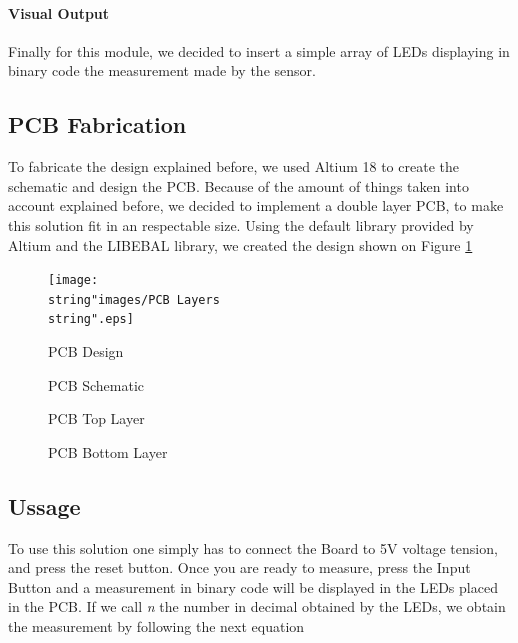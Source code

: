 \paragraph{Visual Output}

Finally for this module, we decided to insert a simple array of LEDs
displaying in binary code the measurement made by the sensor.

\subsection{PCB Fabrication}

To fabricate the design explained before, we used Altium 18 to create
the schematic and design the PCB. Because of the amount of things
taken into account explained before, we decided to implement a double
layer PCB, to make this solution fit in an respectable size. Using
the default library provided by Altium and the LIBEBAL library, we
created the design shown on Figure \ref{8_9}

\begin{figure}[H]
\begin{centering}
\texttt{[image: \\string"images/PCB Layers\\string".eps]}
\par\end{centering}
\caption{PCB Design}
\label{8_9}
\end{figure}

\begin{figure}[H]

\caption{PCB Schematic}

\end{figure}

\begin{figure}[H]

\caption{PCB Top Layer}

\end{figure}

\begin{figure}[H]

\caption{PCB Bottom Layer}

\end{figure}

\subsection{Ussage}

To use this solution one simply has to connect the Board to 5V voltage
tension, and press the reset button. Once you are ready to measure,
press the Input Button and a measurement in binary code will be displayed
in the LEDs placed in the PCB. If we call \emph{n} the number in decimal
obtained by the LEDs, we obtain the measurement by following the next
equation

